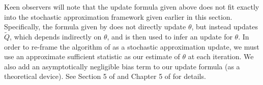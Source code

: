 \documentclass[11pt, oneside]{article}   	%
\begin{document}
Keen observers will note that the update formula given above does not fit exactly into the stochastic approximation framework given earlier in this section. Specifically, the formula given by \citet{Dey99} does not directly update $\theta$, but instead updates $\tilde{Q}$, which depends indirectly on $\theta$, and is then used to infer an update for $\theta$. In order to re-frame the algorithm of \citeauthor{Dey99} as a stochastic approximation update, we must use an approximate sufficient statistic as our estimate of $\theta$ at each iteration. We also add an asymptotically negligible bias term to our update formula (as a theoretical device). See Section 5 of \citet{Dey99} and Chapter 5 of \citet{Kus03} for details.

\end{document}
